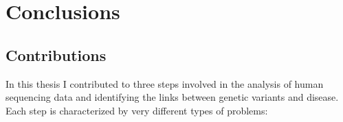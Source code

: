 
\chapter{Conclusions \label{ch:concl}}

\section{Contributions}

In this thesis I contributed to three steps involved in the analysis of human sequencing data and identifying the links between genetic variants and disease. Each step is characterized by very different types of problems:
					

